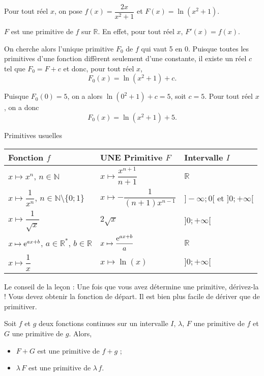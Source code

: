 \documentclass[11pt,fleqn, openany]{book} %
\begin{document}
\begin{example} Pour tout réel $x$, on pose $f(x)=\dfrac{2x}{x^2+1}$ et $F(x)=\ln(x^2+1)$. 

$F$ est une primitive de $f$ sur $\mathbb{R}$. En effet, pour tout réel $x$, $F'(x)=f(x)$.

On cherche alors l'unique primitive $F_0$ de $f$ qui vaut 5 en 0. Puisque toutes les primitives d'une fonction diffèrent seulement d'une constante, il existe un réel $c$ tel que $F_0=F+c$ et donc, pour tout réel $x$, \[F_0(x)=\ln(x^2+1)+c.\] 

Puisque $F_0(0)=5$, on a alors $\ln(0^2+1)+c=5$, soit $c=5$. Pour tout réel $x$, on a donc \[F_0(x)=\ln(x^2+1)+5.\]\vspace{-0.5cm}\end{example}



\begin{proposition}Primitives usuelles
\vskip10pt
\renewcommand{\arraystretch}{2}
\begin{tabularx}{\linewidth}{|X|X|X|}

\hline
Fonction $f$ & \textbf{UNE} Primitive $F$ & Intervalle $I$ \\
\hline
$x \mapsto x^n$, $n\in \mathbb{N}$ & $x\mapsto \dfrac{x^{n+1}}{n+1}$ & $\mathbb{R}$ \\
\hline
$x \mapsto \dfrac{1}{x^n}$, $n\in \mathbb{N}\setminus\{0;1\}$ & $x\mapsto -\dfrac{1}{(n+1)x^{n-1}}$ & $]-\infty;0[$ et $]0;+\infty[$ \\
\hline
$x\mapsto \dfrac{1}{\sqrt{x}}$ & $2\sqrt{x}$ & $]0;+\infty[$ \\
\hline
$x \mapsto \mathrm{e}^{ax+b}$, $a\in \mathbb{R}^*$, $b\in \mathbb{R}$ & $x\mapsto \dfrac{\mathrm{e}^{ax+b}}{a}$ & $\mathbb{R}$ \\
\hline
$x \mapsto \dfrac{1}{x}$ & $x\mapsto \ln(x)$ & $]0;+\infty[$ \\
\hline
\end{tabularx}\end{proposition}

Le conseil de la leçon : Une fois que vous avez détermine une primitive, dérivez-la ! Vous devez obtenir la fonction de départ. Il est bien plus facile de dériver que de primitiver.

\newpage
\begin{proposition}Soit $f$ et $g$ deux fonctions continues sur un intervalle $I$, $\lambda$, $F$ une primitive de $f$ et $G$ une primitive de $g$. Alors,
\begin{itemize}
\item $F+G$ est une primitive de $f+g$ ;
\item $\lambda\,F$ est une primitive de $\lambda\,f$.
\end{itemize}\end{proposition}
\end{document}
